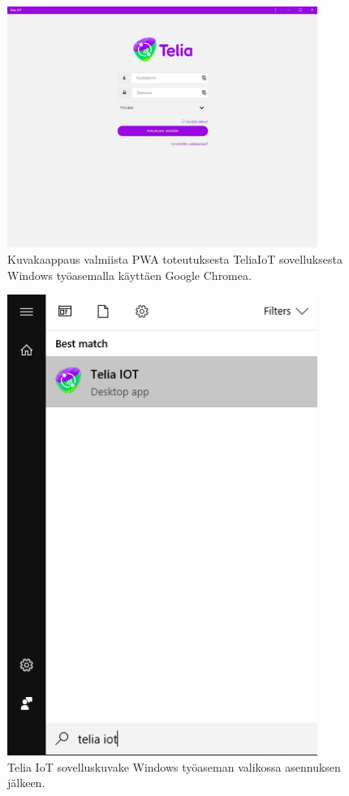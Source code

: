 \documentclass{tktltiki}
\begin{document}
\begin{figure}[!ht]
  \centering
      \includegraphics[width=0.9\textwidth]{teliaiot_desktop_installation.jpg}
  \caption{Kuvakaappaus valmiista PWA toteutuksesta TeliaIoT sovelluksesta Windows työasemalla käyttäen Google Chromea.}
  \label{teliaiot_windowsissa_asennettuna}
\end{figure}

\begin{figure}[!ht]
  \centering
      \includegraphics[width=0.9\textwidth]{windows_valikossa.jpg}
  \caption{Telia IoT sovelluskuvake Windows työaseman valikossa asennuksen jälkeen.}
  \label{teliaiot_windowsvalikossa}
\end{figure}
\end{document}
